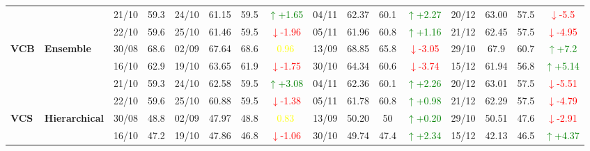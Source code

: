 \documentclass{ieeeaccess}
\begin{document}
\begin{table}[!h]
\begin{tabular}{llcc|cccc|cccc|cccc}
&
& 21/10 & 59.3 & 24/10 & 61.15 & 59.5 & \textcolor{green}{\(\uparrow\)+1.65} & 04/11 & 62.37 & 60.1 & \textcolor{green}{\(\uparrow\)+2.27} & 20/12 & 63.00 & 57.5 & \textcolor{red}{\(\downarrow\)-5.5} \\

&
& 22/10 & 59.6 & 25/10 & 61.46 & 59.5 & \textcolor{red}{\(\downarrow\)-1.96} & 05/11 & 61.96 & 60.8 & \textcolor{green}{\(\uparrow\)+1.16} & 21/12 & 62.45 & 57.5 & \textcolor{red}{\(\downarrow\)-4.95} \\
\midrule

\multirow{4}{*}{\textbf{VCB}} 
& \textbf{Ensemble}
& 30/08 & 68.6 & 02/09 & 67.64 & 68.6 & \textcolor{yellow}{0.96} & 13/09 & 68.85 & 65.8 & \textcolor{red}{\(\downarrow\)-3.05} & 29/10 & 67.9 & 60.7 & \textcolor{green}{\(\uparrow\)+7.2} \\

&
& 16/10 & 62.9 & 19/10 & 63.65 & 61.9 & \textcolor{red}{\(\downarrow\)-1.75} & 30/10 & 64.34 & 60.6 & \textcolor{red}{\(\downarrow\)-3.74} & 15/12 & 61.94 & 56.8 & \textcolor{green}{\(\uparrow\)+5.14} \\

&
& 21/10 & 59.3 & 24/10 & 62.58 & 59.5 & \textcolor{green}{\(\uparrow\)+3.08} & 04/11 & 62.36 & 60.1 & \textcolor{green}{\(\uparrow\)+2.26} & 20/12 & 63.01 & 57.5 & \textcolor{red}{\(\downarrow\)-5.51} \\

&
& 22/10 & 59.6 & 25/10 & 60.88 & 59.5 & \textcolor{red}{\(\downarrow\)-1.38} & 05/11 & 61.78 & 60.8 & \textcolor{green}{\(\uparrow\)+0.98} & 21/12 & 62.29 & 57.5 & \textcolor{red}{\(\downarrow\)-4.79} \\
\midrule



\multirow{4}{*}{\textbf{VCS}} 
& \textbf{Hierarchical}
& 30/08 & 48.8 & 02/09 & 47.97 & 48.8 & \textcolor{yellow}{0.83} & 13/09 & 50.20 & 50 & \textcolor{green}{\(\uparrow\)+0.20} & 29/10 & 50.51 & 47.6 & \textcolor{red}{\(\downarrow\)-2.91} \\

&
& 16/10 & 47.2 & 19/10 & 47.86 & 46.8 & \textcolor{red}{\(\downarrow\)-1.06} & 30/10 & 49.74 & 47.4 & \textcolor{green}{\(\uparrow\)+2.34} & 15/12 & 42.13 & 46.5 & \textcolor{green}{\(\uparrow\)+4.37} \\


\end{tabular}
\end{table}
\end{document}
